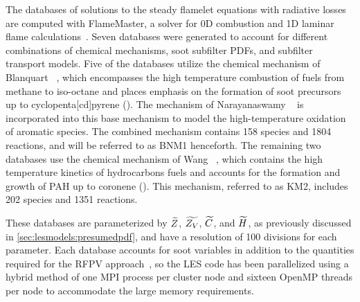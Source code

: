 The databases of solutions to the steady flamelet equations with radiative losses are computed with FlameMaster, a solver for 0D combustion and 1D laminar flame calculations~\cite{flamemaster}. Seven databases were generated to account for different combinations of chemical mechanisms, soot subfilter PDFs, and subfilter transport models. Five of the databases utilize the chemical mechanism of Blanquart \etal~\cite{blanquart2009588}, which encompasses the high temperature combustion of fuels from methane to iso-octane and places emphasis on the formation of soot precursors up to cyclopenta[cd]pyrene (). The mechanism of Narayanaswamy \etal~\cite{narayanaswamy2010} is incorporated into this base mechanism to model the high-temperature oxidation of aromatic species. The combined mechanism contains 158 species and 1804 reactions, and will be referred to as BNM1 henceforth. The remaining two databases use the chemical mechanism of Wang \etal~\cite{wang2013}, which contains the high temperature kinetics of  hydrocarbons fuels and accounts for the formation and growth of PAH up to coronene (). This mechanism, referred to as KM2, includes 202 species and 1351 reactions.

These databases are parameterized by $\widetilde{Z}$, $\widetilde{Z_V}$, $\widetilde{C}$, and $\widetilde{H}$, as previously discussed in \cref{sec:lesmodels:presumedpdf}, and have a resolution of 100 divisions for each parameter. Each database accounts for soot variables in addition to the quantities required for the RFPV approach~\cite{ihme2008}, so the LES code has been parallelized using a hybrid method of one MPI process per cluster node and sixteen OpenMP threads per node to accommodate the large memory requirements.
